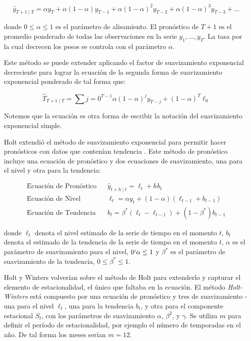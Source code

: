 \[ \hat{y}_{T+1 \mid T} = \alpha y_{T} + \alpha(1-\alpha) y_{T-1} + \alpha(1-\alpha)^2 y_{T-2} + \alpha(1-\alpha)^3 y_{T-3} + \ldots \]

donde $0 \leq \alpha \leq 1$ es el parámetro de alisamiento. El pronóstico de $T + 1$ es el promedio ponderado de todas las observaciones en la serie $y_1, \ldots, y_T$. La tasa por la cual decrecen los pesos se controla con el parámetro $\alpha$.

Este método se puede extender aplicando el factor de suavizamiento exponencial decreciente para lograr la ecuación de la segunda forma de suavizamiento exponencial ponderado de tal forma que:

\[ \hat{T}_{T+1 \mid T} = \sum{j=0}^{T-1} \alpha(1-\alpha)^j y_{T-j} + (1-\alpha)^{T} \ell_{0}  \]

Notemos que la ecuación es otra forma de escribir la notación del suavizamiento exponencial simple.

Holt extendió el método de suavizamiento exponencial para permitir hacer pronósticos con datos que contenían tendencia \cite{hyndman}. Este método de pronóstico incluye una ecuación de pronóstico y dos ecuaciones de suavizamiento, una para el nivel y otra para la tendencia:

\begin{eqnarray*}
	\text{Ecuación de Pronóstico}&&\hat{y}_{t+h \mid t} = \ell_{t} + hb_{t} \\
	\text{Ecuación de Nivel}&&\ell_{t} = \alpha y_{t} + (1 - \alpha)(\ell_{t-1} + b_{t-1}) \\
	\text{Ecuación de Tendencia}&&b_{t} = \beta^{*}(\ell_{t} - \ell_{t-1}) + (1 - \beta^{*})b_{t-1}
\end{eqnarray*}

donde $\ell_{t}$ denota el nivel estimado de la serie de tiempo en el momento $t$, $b_{t}$ denota el estimado de la tendencia de la serie de tiempo en el momento $t$, $\alpha$ es el parámetro de suavizamiento para el nivel, $0 \lq \alpha \leq 1$ y $\beta^{*}$ es el parámetro de suavizamiento de la tendencia, $0 \leq \beta^{*} \leq 1$.

Holt y Winters volverían sobre el método de Holt para extenderlo y capturar el elemento de estacionalidad, el único que faltaba en la ecuación. El método \emph{Holt-Winters} está compuesto por una ecuación de pronóstico y tres de suavizamiento - una para el nivel $\ell_{t}$, una para la tendencia $b_{t}$, y otra para el componente estacional $S_t$, con los parámetros de suavizamiento $\alpha$, $\beta^{2}$, y $\gamma$. Se utiliza $m$ para definir el período de estacionalidad, por ejemplo el número de temporadas en el año. De tal forma los meses serían $m=12$.

